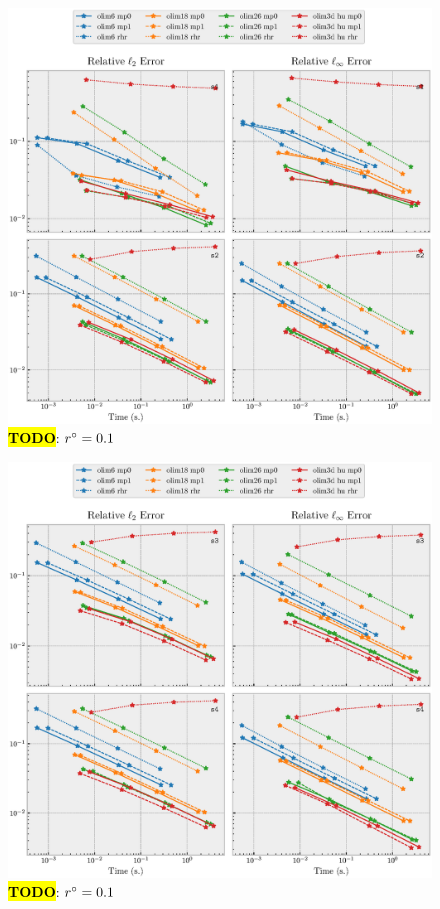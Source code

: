 \documentclass[sisc-eikonal.tex]{subfiles}
\begin{document}
\begin{figure}[H]
  \centering
  \includegraphics[width=\linewidth]{time_vs_error_3d_part1.eps}
  \caption{\hl{\textbf{TODO}}: $r^\circ = 0.1$}
\end{figure}

\begin{figure}[H]
  \centering
  \includegraphics[width=\linewidth]{time_vs_error_3d_part2.eps}
  \caption{\hl{\textbf{TODO}}: $r^\circ = 0.1$}
\end{figure}
\end{document}
